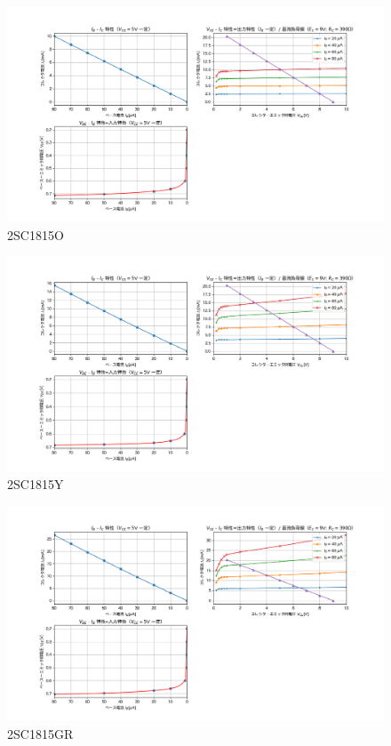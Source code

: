 \documentclass[uplatex,a4paper,11pt,oneside,openany]{jsbook}
\begin{document}
\newpage

\begin{figure}[H]
     \centering
      \includegraphics[keepaspectratio, scale=0.65, angle=90]
                  {figs/png/staticO.png}
                  \caption{2SC1815O}
                  \label{fig:o}
\end{figure}

\begin{figure}[H]
     \centering
      \includegraphics[keepaspectratio, scale=0.65, angle=90]
                {figs/png/staticY.png}
                \caption{2SC1815Y}
                \label{fig:y}
\end{figure}

\begin{figure}[H]
    \centering
     \includegraphics[keepaspectratio, scale=0.65, angle=90]
                 {figs/png/staticG.png}
                 \caption{2SC1815GR}
                 \label{fig:gr}
\end{figure}
\end{document}

